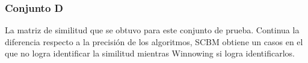 \subsubsection{Conjunto D}
La matriz de similitud que se obtuvo para este conjunto de prueba. Continua la diferencia respecto a la precisión de los algoritmos, SCBM obtiene un casos en el que no logra identificar la similitud mientras Winnowing si logra identificarlos.
\begin{figure}[!h]
\centering
{}
\hspace{-1.5cm}
\hspace{-1.5cm}
\end{figure}
